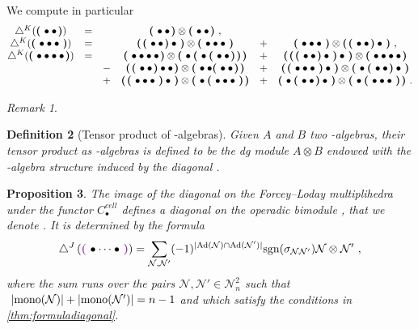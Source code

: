 \documentclass[twoside, 12pt]{amsart}
\newtheorem{definition}{Definition}[section]
\newtheorem{proposition}[definition]{Proposition}
\theoremstyle{remark}
\newtheorem{remark}[definition]{\sc Remark}
\begin{document}
We compute in particular 
\[ \begin{matrix}
\diagainf ( \black { \bullet \bullet } )
&=& & \black{\bullet \bullet} \otimes \black{\bullet \bullet} \ , & & \\
\diagainf ( \black { \bullet \bullet \bullet } ) 
&=& & \black{\black{\bullet \bullet} \bullet} \otimes \black{\bullet \bullet \bullet} &+& \black{\bullet \bullet \bullet} \otimes \black{\black{\bullet \bullet} \bullet} \ , \\
\diagainf ( \black{ \bullet \bullet \bullet \bullet} ) 
&=& & 
\black{\bullet \bullet \bullet \bullet} \otimes \black{\bullet \black{ \bullet \black{ \bullet \bullet }} }  
&+& \black{ \black{ \black{\bullet \bullet} \bullet } \bullet }  \otimes \black{ \bullet \bullet \bullet \bullet } \\
& & -& \black{ \black{\bullet \bullet } \bullet \bullet } \otimes \black{ \bullet \bullet \black{ \bullet \bullet }}  &+& \black{ \black{ \bullet \bullet \bullet } \bullet }  \otimes \black{ \bullet \black{ \bullet \bullet } \bullet }  \\ 
& & +& \black{ \black{ \bullet \bullet \bullet } \bullet }  \otimes \black{ \bullet \black{ \bullet \bullet \bullet }} &+& \black{ \bullet \black{ \bullet \bullet } \bullet } \otimes \black{ \bullet \black{ \bullet \bullet \bullet }} \ .
\end{matrix} \]

\begin{remark}
\end{remark}

\begin{definition}[Tensor product of \Ainf -algebras] \label{def:tensor-product-ainf-alg}
Given $A$ and $B$ two \Ainf -algebras, their tensor product as \Ainf -algebras is defined to be the dg module $A \otimes B$ endowed with the \Ainf -algebra structure induced by the diagonal \diagainf .
\end{definition}

\begin{proposition}
\label{prop:diagonal-polytopale-m-infini}
The image of the diagonal on the Forcey--Loday multiplihedra under the functor $C_\bullet^{cell}$ defines a diagonal on the operadic bimodule \Minf , that we denote \diagminf . It is determined by the formula
\[ \diagminf \left( \purple{\bullet \cdots \bullet} \right) = 
\sum_{
\mathcal{N},\mathcal{N}'} 
(-1)^{|\mathrm{Ad}(\mathcal{N})\cap \mathrm{Ad}(\mathcal{N}')|}
\mathrm{sgn}(\sigma_{\mathcal{N}\mathcal{N}'})
\mathcal{N} \otimes \mathcal{N}' \ ,\]
where the sum runs over the pairs $\mathcal{N},\mathcal{N}' \in \mathcal{N}^2_n$ such that $\ |\mono(\mathcal{N})|+|\mono(\mathcal{N}')|=n-1$ and which satisfy the conditions in \cref{thm:formuladiagonal}.
\end{proposition}
\end{document}
